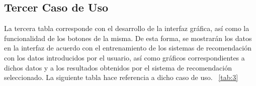 \subsection{Tercer Caso de Uso}
La tercera tabla corresponde con  el desarrollo de la interfaz gráfica, así como la funcionalidad de los botones de la misma. De esta forma, se mostrarán los datos en la interfaz de acuerdo con el entrenamiento de los sistemas de recomendación con los datos introducidos por el usuario, así como gráficos correspondientes a dichos datos y a los resultados obtenidos por el sistema de recomendación seleccionado. La siguiente tabla hace referencia a dicho caso de uso. ~\ref{tab:3}
\begin{table}[]
\caption{Tabla Caso de Uso 3}
\label{tab:3 }
\end{table}

